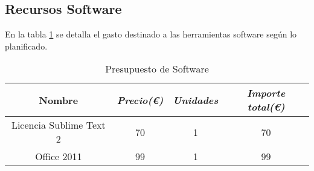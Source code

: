 \subsection{Recursos Software}

En la tabla \ref{tab:budget-software} se detalla el gasto destinado a las herramientas software según lo planificado.

\begin{table}[htp]
	\centering
	\caption{Presupuesto de Software}\label{tab:budget-software}
	\begin{tabular}{cccc}
		\toprule
    	\textbf{Nombre} & \emph{Precio(\euro)} & \emph{Unidades} & \emph{Importe total(\euro)}\\
    	\midrule
    	Licencia Sublime Text 2		& 	70				&	1 			& 	70\\
    	Office 2011 				&	99				&	1			&	99\\
    	\bottomrule
    \end{tabular}
\end{table}